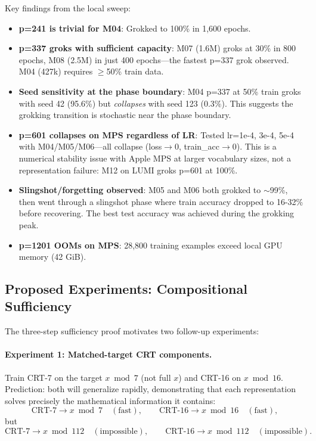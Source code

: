 Key findings from the local sweep:
\begin{itemize}[leftmargin=*]
    \item \textbf{p=241 is trivial for M04}: Grokked to 100\% in 1,600 epochs.
    \item \textbf{p=337 groks with sufficient capacity}: M07 (1.6M) groks at 30\% in 800 epochs, M08 (2.5M) in just 400 epochs---the fastest p=337 grok observed. M04 (427k) requires $\geq$50\% train data.
    \item \textbf{Seed sensitivity at the phase boundary}: M04 p=337 at 50\% train groks with seed 42 (95.6\%) but \emph{collapses} with seed 123 (0.3\%). This suggests the grokking transition is stochastic near the phase boundary.
    \item \textbf{p=601 collapses on MPS regardless of LR}: Tested lr=1e-4, 3e-4, 5e-4 with M04/M05/M06---all collapse (loss$\to$0, train\_acc$\to$0). This is a numerical stability issue with Apple MPS at larger vocabulary sizes, not a representation failure: M12 on LUMI groks p=601 at 100\%.
    \item \textbf{Slingshot/forgetting observed}: M05 and M06 both grokked to $\sim$99\%, then went through a slingshot phase where train accuracy dropped to 16-32\% before recovering. The best test accuracy was achieved during the grokking peak.
    \item \textbf{p=1201 OOMs on MPS}: 28,800 training examples exceed local GPU memory (42 GiB).
\end{itemize}


\subsection{Proposed Experiments: Compositional Sufficiency}
\label{sec:proposed}

The three-step sufficiency proof motivates two follow-up experiments:

\paragraph{Experiment 1: Matched-target CRT components.}
Train CRT-7 on the target $x \bmod 7$ (not full $x$) and CRT-16 on $x \bmod 16$. Prediction: both will generalize rapidly, demonstrating that each representation solves precisely the mathematical information it contains:
\[
    \text{CRT-7} \to x \bmod 7 \quad (\text{fast}), \qquad
    \text{CRT-16} \to x \bmod 16 \quad (\text{fast}),
\]
but
\[
    \text{CRT-7} \to x \bmod 112 \quad (\text{impossible}), \qquad
    \text{CRT-16} \to x \bmod 112 \quad (\text{impossible}).
\]

